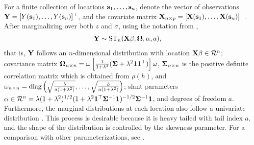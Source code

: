 For a finite collection of locations $\mathbf{s}_1, \ldots, \mathbf{s}_n$, denote the vector of observations $\mathbf{Y} = [Y(\mathbf{s}_1), \ldots, Y(\mathbf{s}_n)]^\top$, and the covariate matrix $\mathbf{X}_{n \times p} = [\mathbf{X}(\mathbf{s}_1), \ldots, \mathbf{X}(\mathbf{s}_n)]^\top$.
After marginalizing over both $z$ and $\sigma$, using the notation from \citet[p. 176]{Azzalini2014},
\begin{align} \label{steq:stazzalini}
  \mathbf{Y} \sim \text{ST}_n(\mathbf{X} \mathbf{\beta}, \mathbf{\Omega}, \mathbf{\alpha}, a),
\end{align}
that is, $\mathbf{Y}$ follows an $n$-dimensional \skewt distribution with location $\mathbf{X} \mathbf{\beta} \in {\cal R}^n$; covariance matrix $\mathbf{\Omega}_{n \times n} = \mathbf{\omega} \left[ \frac{1}{1 + \lambda^2}(\mathbf{\Sigma} + \lambda^2 \mathbf{1} \mathbf{1}^\top) \right] \mathbf{\omega}$, $\mathbf{\Sigma}_{n \times n}$ is the positive definite correlation matrix which is obtained from $\rho(h)$, and $\mathbf{\omega}_{n \times n} = \text{diag}\left(\sqrt{\frac{ b }{a(1 + \lambda^2)}}, \ldots, \sqrt{\frac{ b }{a(1 + \lambda^2)}} \right)$; slant parameters $\mathbf{\alpha} \in {\cal R}^n = \lambda (1 + \lambda^2)^{1 / 2} (1 + \lambda^2 \mathbf{1}^\top \mathbf{\Sigma}^{-1} \mathbf{1})^{-1/2} \mathbf{\Sigma}^{-1} \mathbf{1}$, and degrees of freedom $a$.
Furthermore, the marginal distributions at each location also follow a univariate \skewt distribution \citep{Azzalini2014}.
This process is desirable because it is heavy tailed with tail index $a$, and the shape of the distribution is controlled by the skewness parameter.
For a comparison with other parameterizations, see .


